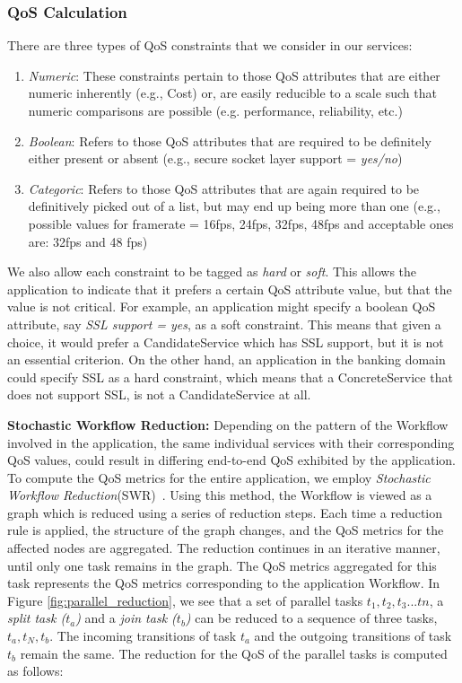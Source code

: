 \documentclass[10pt,journal,compsoc]{IEEEtran}
\begin{document}
\subsubsection{QoS Calculation}
There are three types of QoS constraints that we consider in our services:
	\begin{enumerate}
	    \item \textit{Numeric}: These constraints pertain to those QoS attributes that are either numeric inherently (e.g., Cost) or, are easily reducible to a scale such that numeric comparisons are possible (e.g. performance, reliability, etc.)
	    \item \textit{Boolean}: Refers to those QoS attributes that are required to be definitely either present or absent (e.g., secure socket layer support = \textit{yes/no})
	    \item \textit{Categoric}: Refers to those QoS attributes that are again required to be definitively picked out of a list, but may end up being more than one (e.g., possible values for framerate = 16fps, 24fps, 32fps, 48fps and acceptable ones are: 32fps and 48 fps) 
	\end{enumerate}
We also allow each constraint to be tagged as \textit{hard} or \textit{soft}. This allows the application to indicate that it prefers a certain QoS attribute value, but that the value is not critical. For example, an application might specify a boolean QoS attribute, say \textit{SSL support = yes}, as a soft constraint. This means that given a choice, it would prefer a CandidateService which has SSL support, but it is not an essential criterion. On the other hand, an application in the banking domain could specify SSL as a hard constraint, which means that a ConcreteService that does not support SSL, is not a CandidateService at all.

\textbf{Stochastic Workflow Reduction\label{swr}:} Depending on the pattern of the Workflow involved in the application, the same individual services with their corresponding QoS values, could result in differing end-to-end QoS exhibited by the application. To compute the QoS metrics for the entire application, we employ \textit{Stochastic Workflow Reduction}(SWR)~\cite{Cardoso2002Workflow}. Using this method, the Workflow is viewed as a graph which is reduced using a series of reduction steps. Each time a reduction rule is applied, the structure of the graph changes, and the QoS metrics for the affected nodes are aggregated. The reduction continues in an iterative manner, until only one task remains in the graph. The QoS metrics aggregated for this task represents the QoS metrics corresponding to the application Workflow. In Figure \ref{fig:parallel_reduction}, we see that a set of parallel tasks $t_{1}, t_{2}, t_{3}...t{n}$, a \textit{split task ($t_{a}$)} and a \textit{join task ($t_{b}$)} can be reduced to a sequence of three tasks, $t_{a}, t_{N}, t_{b}$. The incoming transitions of task $t_{a}$ and the outgoing transitions of task $t_{b}$ remain the same. The reduction for the QoS of the parallel tasks is computed as follows:
\end{document}

